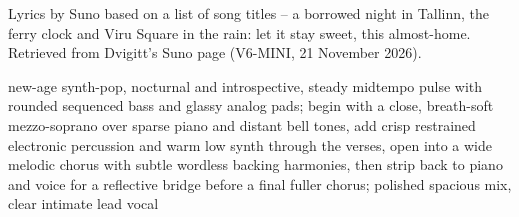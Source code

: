 
\begin{notes}
Lyrics by Suno based on a list of song titles -- a borrowed night in Tallinn, the ferry clock and Viru Square in the rain: let it stay sweet, this almost-home. Retrieved from Dvigitt's Suno page (V6-MINI, 21 November 2026).
\end{notes}
\begin{style}
new-age synth-pop, nocturnal and introspective, steady midtempo pulse with rounded sequenced bass and glassy analog pads; begin with a close, breath-soft mezzo-soprano over sparse piano and distant bell tones, add crisp restrained electronic percussion and warm low synth through the verses, open into a wide melodic chorus with subtle wordless backing harmonies, then strip back to piano and voice for a reflective bridge before a final fuller chorus; polished spacious mix, clear intimate lead vocal
\end{style}
